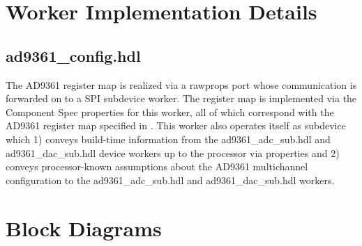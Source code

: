 \documentclass{article}
\def\comp{ad9361\_config}
\begin{document}
\section{Worker Implementation Details}
\subsection{\comp.hdl}
The AD9361 register map is realized via a rawprops port whose communication is forwarded on to a SPI subdevice worker. The register map is implemented via the Component Spec properties for this worker, all of which correspond with the AD9361 register map specified in \cite{adi_ug671}. This worker also operates itself as subdevice which 1) conveys build-time information from the ad9361\_adc\_sub.hdl and ad9361\_dac\_sub.hdl device workers up to the processor via properties and 2) conveys processor-known assumptions about the AD9361 multichannel configuration to the ad9361\_adc\_sub.hdl and ad9361\_dac\_sub.hdl workers.

\section{Block Diagrams}
\end{document}
